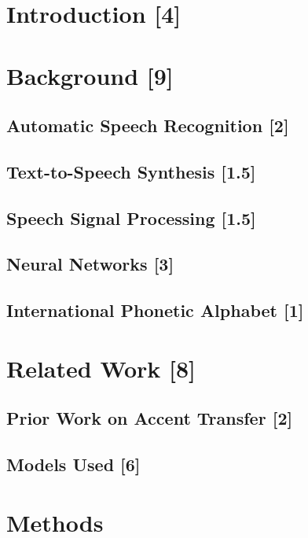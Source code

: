 


\section{Introduction [4]}
  
\section{Background [9]}
    \subsection{Automatic Speech Recognition [2]}
        
    \subsection{Text-to-Speech Synthesis [1.5]}
        
    \subsection{Speech Signal Processing [1.5]}
        
    \subsection{Neural Networks [3]}
        
    \subsection{International Phonetic Alphabet [1]}
        
\section{Related Work [8]}
    \subsection{Prior Work on Accent Transfer [2]}
        
    \subsection{Models Used [6]}
        
        \newpage
\section{Methods} %
